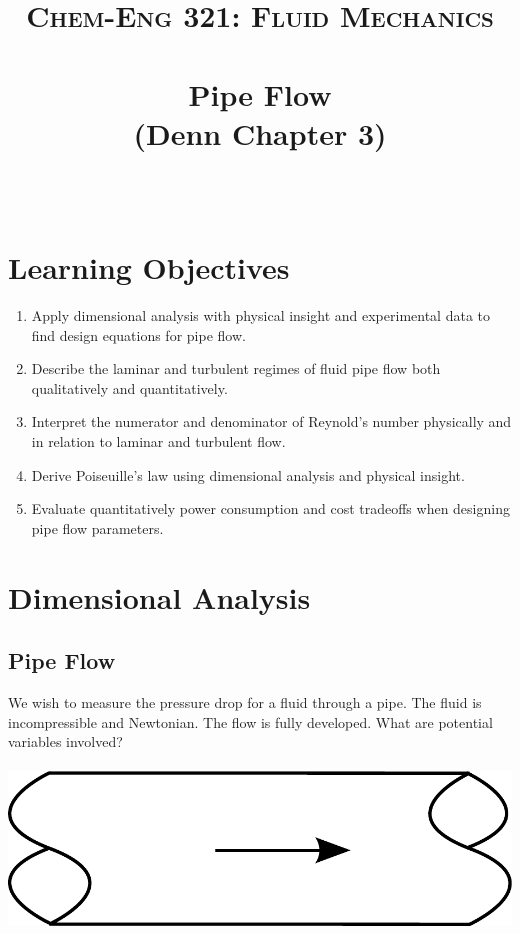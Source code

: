 \documentclass[paper=a4, fontsize=12pt]{scrartcl} %
\author{\vspace{-5ex}}
\date{\vspace{-10ex}}
\title{	
\normalfont \normalsize 
\textsc{Chem-Eng 321: Fluid Mechanics} \\ [10pt] %
\horrule{0.5pt} \\[0.2cm] %
\huge Pipe Flow \\ (Denn Chapter 3) \\ %
\horrule{2pt} \\[0.2cm] %
}
\numberwithin{equation}{section} %
\numberwithin{figure}{section} %
\numberwithin{table}{section} %
\begin{document}
\maketitle %

\thispagestyle{empty}

\section*{Learning Objectives}

\begin{enumerate}
\item Apply dimensional analysis with physical insight and experimental data to find design equations for pipe flow.
\item Describe the laminar and turbulent regimes of fluid pipe flow both qualitatively and quantitatively.
\item  Interpret the numerator and denominator of Reynold's number physically and in relation to laminar and turbulent flow.
\item Derive Poiseuille's law using dimensional analysis and physical insight.
\item Evaluate quantitatively power consumption and cost tradeoffs when designing pipe flow parameters. 
\end{enumerate}

\section*{Dimensional Analysis}

\subsection*{Pipe Flow}

We wish to measure the pressure drop for a fluid through a pipe. The fluid is incompressible and Newtonian. The flow is fully developed. What are potential variables involved?
\\
\\
\includegraphics[scale=0.5]{fluidthroughpipe.pdf}
\end{document}
